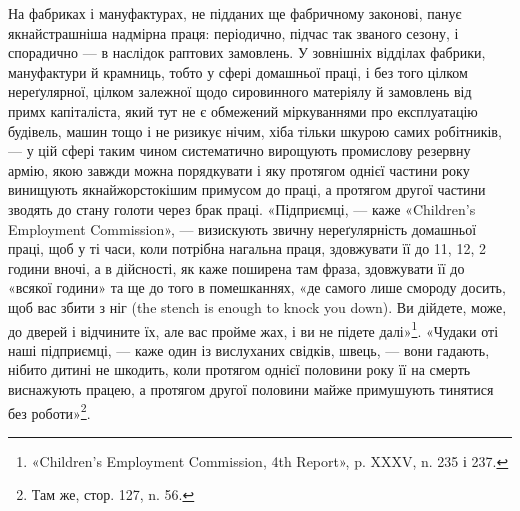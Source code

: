 
На фабриках і мануфактурах, не підданих ще фабричному
законові, панує якнайстрашніша надмірна праця: періодично,
підчас так званого сезону, і спорадично — в наслідок раптових замовлень. У зовнішніх відділах
фабрики, мануфактури й
крамниць, тобто у сфері домашньої праці, і без того цілком нереґулярної, цілком залежної щодо
сировинного матеріялу й замовлень
від примх капіталіста, який тут не є обмежений міркуваннями
про експлуатацію будівель, машин тощо і не ризикує нічим, хіба
тільки шкурою самих робітників, — у цій сфері таким чином систематично вирощують промислову резервну
армію, якою завжди
можна порядкувати і яку протягом однієї частини року винищують якнайжорстокішим примусом до праці, а
протягом другої
частини зводять до стану голоти через брак праці. «Підприємці, — каже «Children’s Employment
Commission», — визискують
звичну нереґулярність домашньої праці, щоб у ті часи, коли
потрібна нагальна праця, здовжувати її до 11, 12, 2 години
вночі, а в дійсності, як каже поширена там фраза, здовжувати
її до «всякої години» та ще до того в помешканнях, «де самого
лише смороду досить, щоб вас збити з ніг (the stench is enough
to knock you down). Ви дійдете, може, до дверей і відчините їх,
але вас пройме жах, і ви не підете далі»\footnote{
«Children’s Employment Commission, 4th Report», p. XXXV,
n. 235 і 237.
}. «Чудаки оті наші
підприємці, — каже один із вислуханих свідків, швець, — вони
гадають, нібито дитині не шкодить, коли протягом однієї половини року її на смерть виснажують
працею, а протягом другої
половини майже примушують тинятися без роботи»\footnote{
Там же, стор. 127, n. 56.
}.

